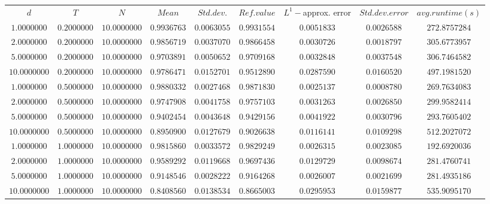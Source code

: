 \begin{tabular}{ccccccccc}
$d$ & $T$ & $N$ & $Mean$ & $Std. dev.$ & $Ref. value$ & $L^1-$approx. error & $Std. dev. error$ & $avg. runtime (s)$\\
$1.0000000$ & $0.2000000$ & $10.0000000$ & $0.9936763$ & $0.0063055$ & $0.9931554$ & $0.0051833$ & $0.0026588$ & $272.8757284$\\
$2.0000000$ & $0.2000000$ & $10.0000000$ & $0.9856719$ & $0.0037070$ & $0.9866458$ & $0.0030726$ & $0.0018797$ & $305.6773957$\\
$5.0000000$ & $0.2000000$ & $10.0000000$ & $0.9703891$ & $0.0050652$ & $0.9709168$ & $0.0032848$ & $0.0037548$ & $306.7464582$\\
$10.0000000$ & $0.2000000$ & $10.0000000$ & $0.9786471$ & $0.0152701$ & $0.9512890$ & $0.0287590$ & $0.0160520$ & $497.1981520$\\
$1.0000000$ & $0.5000000$ & $10.0000000$ & $0.9880332$ & $0.0027468$ & $0.9871830$ & $0.0025137$ & $0.0008780$ & $269.7634083$\\
$2.0000000$ & $0.5000000$ & $10.0000000$ & $0.9747908$ & $0.0041758$ & $0.9757103$ & $0.0031263$ & $0.0026850$ & $299.9582414$\\
$5.0000000$ & $0.5000000$ & $10.0000000$ & $0.9402454$ & $0.0043648$ & $0.9429156$ & $0.0041922$ & $0.0030796$ & $293.7605402$\\
$10.0000000$ & $0.5000000$ & $10.0000000$ & $0.8950900$ & $0.0127679$ & $0.9026638$ & $0.0116141$ & $0.0109298$ & $512.2027072$\\
$1.0000000$ & $1.0000000$ & $10.0000000$ & $0.9815860$ & $0.0033572$ & $0.9829249$ & $0.0026315$ & $0.0023085$ & $192.6920036$\\
$2.0000000$ & $1.0000000$ & $10.0000000$ & $0.9589292$ & $0.0119668$ & $0.9697436$ & $0.0129729$ & $0.0098674$ & $281.4760741$\\
$5.0000000$ & $1.0000000$ & $10.0000000$ & $0.9148546$ & $0.0028222$ & $0.9164268$ & $0.0026007$ & $0.0021699$ & $281.4935186$\\
$10.0000000$ & $1.0000000$ & $10.0000000$ & $0.8408560$ & $0.0138534$ & $0.8665003$ & $0.0295953$ & $0.0159877$ & $535.9095170$\\
\end{tabular}
